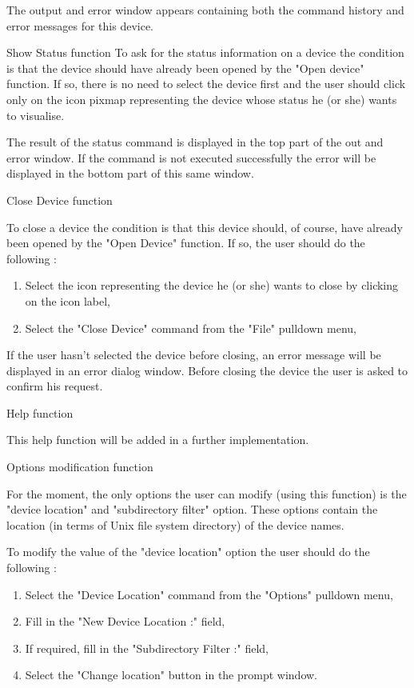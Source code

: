 The output and error window appears containing both the command history and 
error messages for this device. 


  {Show Status function}
To ask for the status information on a device the condition is that the device
should have already been opened by the "Open device" function. If so, there is 
no need to select the device first and the user should click only on the icon
pixmap representing the device whose status he (or she) wants to visualise.

The result of the status command is displayed in the top part of the out and 
error window.
If the command is not executed successfully the error will be displayed in the
bottom part of this same window.

	{Close Device function}

To close a device the condition is that this device should, of course, have
already been opened by the "Open Device" function. If so, the user should do the
following :
\begin{enumerate}
\item
Select the icon representing the device he (or she) wants to close by clicking
on the icon label,
\item
Select the "Close Device" command from the "File" pulldown menu,
\end{enumerate}

If the user hasn't selected the device before closing, an error message will be 
displayed in an error dialog window\footnotemark[1]. Before closing the device 
the user is asked to confirm his request. 
 

	{Help function}

This help function will be added in a further implementation.


	{Options modification function}

For the moment, the only options the user can modify (using this function) is
the "device location" and "subdirectory filter" option. These options contain 
the location (in terms of Unix file system directory) of the device names.

To modify the value of the "device location" option the user should do the
following :
\begin{enumerate}
\item
Select the "Device Location" command from the "Options" pulldown menu,
\item
Fill in the "New Device Location :" field,
\item
If required, fill in the "Subdirectory Filter :" field,
\item
Select the "Change location" button in the prompt window.
\end{enumerate}


